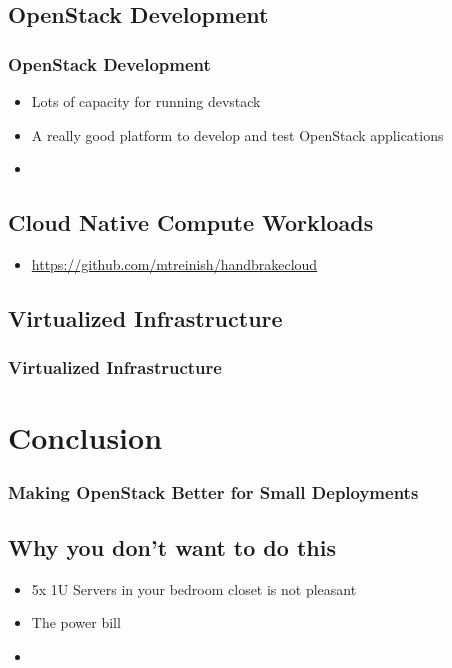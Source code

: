 \documentclass[aspectratio=169,11pt,hyperref={colorlinks=true}]{beamer}
\begin{document}
\subsection{OpenStack Development}
\begin{frame}
    \frametitle{OpenStack Development}
    \begin{itemize}
        \item Lots of capacity for running devstack
        \item A really good platform to develop and test OpenStack
              applications
        \item
    \end{itemize}
\end{frame}

\subsection{Cloud Native Compute Workloads}
\begin{frame}
    \begin{itemize}
        \frametitle{Cloud Native Compute Workloads}
        \item \href{https://github.com/mtreinish/handbrakecloud}{https://github.com/mtreinish/handbrakecloud}
    \end{itemize}
\end{frame}

\subsection{Virtualized Infrastructure}
\begin{frame}
    \frametitle{Virtualized Infrastructure}
\end{frame}



\section{Conclusion}
\begin{frame}
    \frametitle{Making OpenStack Better for Small Deployments}
\end{frame}

\subsection{Why you don't want to do this}
\begin{frame}
    \begin{itemize}
        \item 5x 1U Servers in your bedroom closet is not pleasant
        \item The power bill
        \item 
    \end{itemize}
\end{frame}
\end{document}

